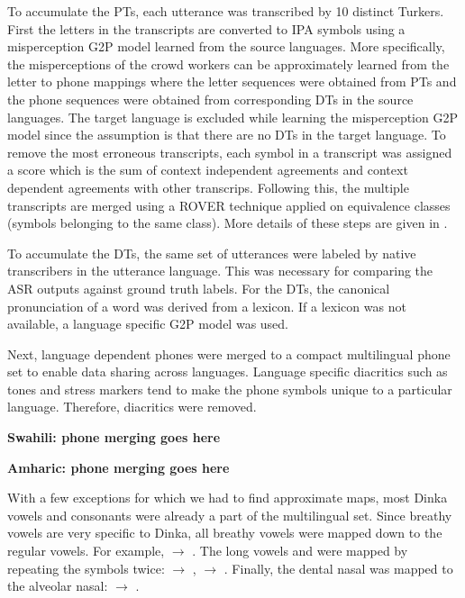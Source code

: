 \documentclass[a4paper]{article}
\begin{document}
To accumulate the PTs, each utterance was transcribed by 10 distinct Turkers. First the letters in the transcripts are converted to IPA symbols using a misperception G2P model learned from the source languages. More specifically, the misperceptions of the crowd workers can be approximately learned from the letter to phone mappings where the letter sequences were obtained from PTs and the phone sequences were obtained from corresponding DTs in the source languages. The target language is excluded while learning the misperception G2P model since the assumption is that there are no DTs in the target language. To remove the most erroneous transcripts, each symbol in a transcript was assigned a score which is the sum of context independent agreements and context dependent agreements with other transcrips. Following this, the multiple transcripts are merged using a ROVER technique applied on equivalence classes (symbols belonging to the same class). More details of these steps are given in \cite{Jyothi-MismatchedCrowdsourcingTrans}. 

To accumulate the DTs, the same set of utterances were labeled by native transcribers in the utterance language. This was necessary for comparing the ASR outputs against ground truth labels. For the DTs, the canonical pronunciation of a word was derived from a lexicon. If a lexicon was not available, a language specific G2P model was used.


Next, language dependent phones were merged to a compact multilingual phone set to enable data sharing across languages. Language specific diacritics such as tones and stress markers tend to make the phone symbols unique to a particular language. Therefore,  diacritics were removed. 

\textbf{Swahili: phone merging goes here}

\textbf{Amharic: phone merging goes here}

With a few exceptions for which we had to find approximate maps, most Dinka vowels and consonants were already a part of the multilingual set. Since breathy vowels are very specific to Dinka, all breathy vowels were mapped down to the regular vowels. For example,  $\rightarrow$ . The long vowels  and  were mapped by repeating the symbols twice:  $\rightarrow$ ,  $\rightarrow$ . Finally, the dental nasal was mapped to the alveolar nasal: \textipa{\|[n} $\rightarrow$ . 
\end{document}
